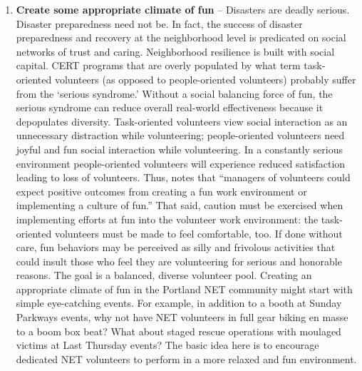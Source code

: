 \documentclass[11pt,fleqn]{book} %
\begin{document}
\begin{enumerate}
  \item \textbf{Create some appropriate climate of fun} -- Disasters are deadly serious. Disaster preparedness need not be. In fact, the success of disaster preparedness and recovery at the neighborhood level is predicated on social networks of trust and caring. Neighborhood resilience is built with social capital. CERT programs that are overly populated by what \textcite{karl_give_2008} term task-oriented volunteers (as opposed to people-oriented volunteers) probably suffer from the \enquote*{serious syndrome.} Without a social balancing force of fun, the serious syndrome can reduce overall real-world effectiveness because it depopulates diversity. Task-oriented volunteers view social interaction as an unnecessary distraction while volunteering; people-oriented volunteers need joyful and fun social interaction while volunteering. In a constantly serious environment people-oriented volunteers will experience reduced satisfaction leading to loss of volunteers. Thus, \textcite{karl_give_2008} notes that \enquote{managers of volunteers could expect positive outcomes from creating a fun work environment or implementing a culture of fun.} That said, caution must be exercised when implementing efforts at fun into the volunteer work environment: the task-oriented volunteers must be made to feel comfortable, too. If done without care, fun behaviors may be perceived as silly and frivolous activities that could insult those who feel they are volunteering for serious and honorable reasons. The goal is a balanced, diverse volunteer pool. Creating an appropriate climate of fun in the Portland NET community might start with simple eye-catching events. For example, in addition to a booth at Sunday Parkways events, why not have NET volunteers in full gear biking en masse to a boom box beat? What about staged rescue operations with moulaged victims at Last Thursday events? The basic idea here is to encourage dedicated NET volunteers to perform in a more relaxed and fun environment.
\end{enumerate}
  




          

\printbibliography
\end{document}
